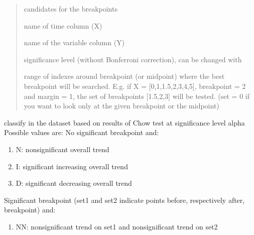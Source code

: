 \documentclass[letterpaper,10pt,english]{sphinxmanual}
\begin{document}
\begin{fulllineitems}
\begin{quote}
\begin{description}
\sphinxAtStartPar
candidates for the breakpoints

\sphinxAtStartPar
name of time column (X)

\sphinxAtStartPar
name of the variable column (Y)

\sphinxAtStartPar
{} \textendash{} significance level (without Bonferroni correction), can be changed with 

\sphinxAtStartPar
range of indexes around breakpoint (or midpoint) where the best breakpoint
will be searched. E.g. if X = {[}0,1,1.5,2,3,4,5{]}, breakpoint = 2 and margin = 1,
the set of breakpoints {[}1.5,2,3{]} will be tested.
(set = 0 if you want to look only at the given breakpoint or the midpoint)

\end{description}\end{quote}

\begin{fulllineitems}
\label{\detokenize{source/chowclassifier:chowclassifier.chow.Chow.classify}}
\pysigstartsignatures
{}
\pysigstopsignatures
\sphinxAtStartPar
classify in the dataset based on results of Chow test at significance level alpha
Possible values are:
No significant breakpoint and:
\begin{enumerate}
%
\item {} 
\sphinxAtStartPar
N: non\sphinxhyphen{}significant overall trend

\item {} 
\sphinxAtStartPar
I: significant increasing overall trend

\item {} 
\sphinxAtStartPar
D: significant decreasing overall trend

\end{enumerate}

\sphinxAtStartPar
Significant breakpoint (set1 and set2 indicate points before, respectively after, breakpoint) and:
\begin{enumerate}
%
\setcounter{enumi}{3}
\item {} 
\sphinxAtStartPar
NN: non\sphinxhyphen{}significant trend on set1 and non\sphinxhyphen{}significant trend on set2


\end{enumerate}
\end{fulllineitems}
\end{fulllineitems}
\end{document}
